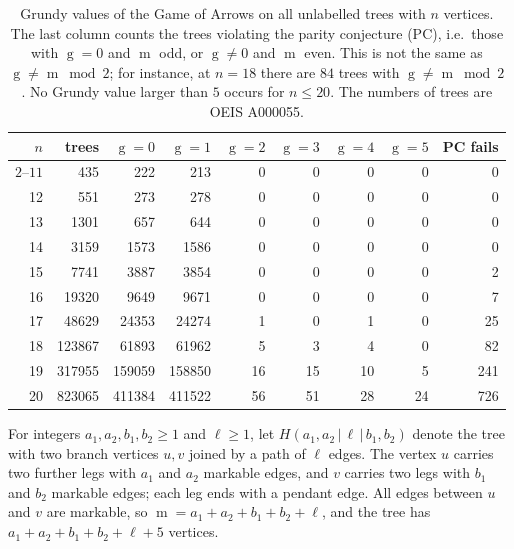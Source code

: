 \documentclass[11pt]{amsart}
\theoremstyle{definition}
\theoremstyle{remark}
\newcommand{\gv}{\operatorname{g}}           %
\newcommand{\m}{\operatorname{m}}
\begin{document}
\begin{table}[t]
\centering
\small
\begin{tabular}{rrrrrrrrr}
\toprule
$n$ & trees & $\gv=0$ & $\gv=1$ & $\gv=2$ & $\gv=3$ & $\gv=4$ & $\gv=5$ & PC fails\\
\midrule
$2$--$11$ & 435 & 222 & 213 & 0 & 0 & 0 & 0 & 0 \\
12 & 551 & 273 & 278 & 0 & 0 & 0 & 0 & 0\\
13 & 1301 & 657 & 644 & 0 & 0 & 0 & 0 & 0\\
14 & 3159 & 1573 & 1586 & 0 & 0 & 0 & 0 & 0\\
15 & 7741 & 3887 & 3854 & 0 & 0 & 0 & 0 & 2\\
16 & 19320 & 9649 & 9671 & 0 & 0 & 0 & 0 & 7\\
17 & 48629 & 24353 & 24274 & 1 & 0 & 1 & 0 & 25\\
18 & 123867 & 61893 & 61962 & 5 & 3 & 4 & 0 & 82\\
19 & 317955 & 159059 & 158850 & 16 & 15 & 10 & 5 & 241\\
20 & 823065 & 411384 & 411522 & 56 & 51 & 28 & 24 & 726\\
\bottomrule
\end{tabular}
\caption{Grundy values of the Game of Arrows on all unlabelled trees with $n$ vertices. The last column counts the trees violating the parity conjecture (PC), i.e.\ those with $\gv=0$ and $\m$ odd, or $\gv\neq0$ and $\m$ even. This is not the same as $\gv\ne\m\bmod2$; for instance, at $n=18$ there are $84$ trees with $\gv\ne\m\bmod 2$. No Grundy value larger than $5$ occurs for $n\le 20$. The numbers of trees are OEIS A000055.}
\label{tab:census}
\end{table}

For integers $a_1,a_2,b_1,b_2\ge1$ and $\ell\ge1$, let $H(a_1,a_2\,|\,\ell\,|\,b_1,b_2)$ denote the tree with two branch vertices $u,v$ joined by a path of $\ell$ edges. The vertex $u$ carries two further legs with $a_1$ and $a_2$ markable edges, and $v$ carries two legs with $b_1$ and $b_2$ markable edges; each leg ends with a pendant edge. All edges between $u$ and $v$ are markable, so $\m=a_1+a_2+b_1+b_2+\ell$, and the tree has $a_1+a_2+b_1+b_2+\ell+5$ vertices.
\end{document}
